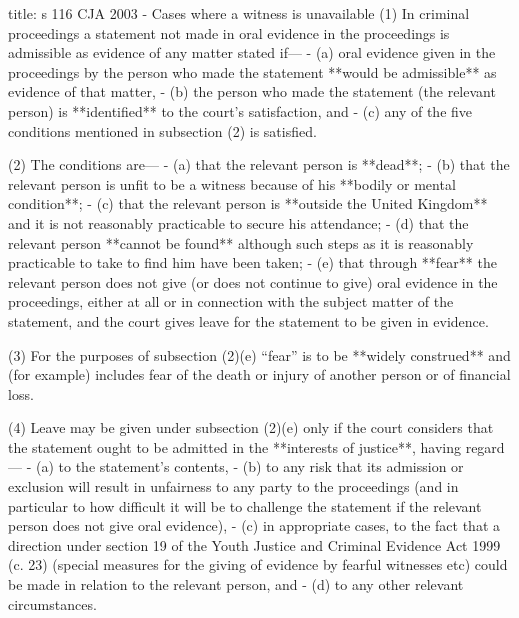 \documentclass[
]{article}
\newenvironment{Shaded}{}{}
\newcommand{\NormalTok}[1]{#1}
\begin{document}
\begin{Shaded}
\begin{Highlighting}[]
\NormalTok{title: s 116 CJA 2003 {-} Cases where a witness is unavailable}
\NormalTok{(1) In criminal proceedings a statement not made in oral evidence in the proceedings is admissible as evidence of any matter stated if—}
\NormalTok{{-} (a) oral evidence given in the proceedings by the person who made the statement **would be admissible** as evidence of that matter,}
\NormalTok{{-} (b) the person who made the statement (the relevant person) is **identified** to the court’s satisfaction, and}
\NormalTok{{-} (c) any of the five conditions mentioned in subsection (2) is satisfied.}

\NormalTok{(2) The conditions are—}
\NormalTok{{-} (a) that the relevant person is **dead**;}
\NormalTok{{-} (b) that the relevant person is unfit to be a witness because of his **bodily or mental condition**;}
\NormalTok{{-} (c) that the relevant person is **outside the United Kingdom** and it is not reasonably practicable to secure his attendance;}
\NormalTok{{-} (d) that the relevant person **cannot be found** although such steps as it is reasonably practicable to take to find him have been taken;}
\NormalTok{{-} (e) that through **fear** the relevant person does not give (or does not continue to give) oral evidence in the proceedings, either at all or in connection with the subject matter of the statement, and the court gives leave for the statement to be given in evidence.}

\NormalTok{(3) For the purposes of subsection (2)(e) “fear” is to be **widely construed** and (for example) includes fear of the death or injury of another person or of financial loss.}

\NormalTok{(4) Leave may be given under subsection (2)(e) only if the court considers that the statement ought to be admitted in the **interests of justice**, having regard—}
\NormalTok{{-} (a) to the statement’s contents,}
\NormalTok{{-} (b) to any risk that its admission or exclusion will result in unfairness to any party to the proceedings (and in particular to how difficult it will be to challenge the statement if the relevant person does not give oral evidence),}
\NormalTok{{-} (c) in appropriate cases, to the fact that a direction under section 19 of the Youth Justice and Criminal Evidence Act 1999 (c. 23) (special measures for the giving of evidence by fearful witnesses etc) could be made in relation to the relevant person, and}
\NormalTok{{-} (d) to any other relevant circumstances.}
\end{Highlighting}
\end{Shaded}
\end{document}
